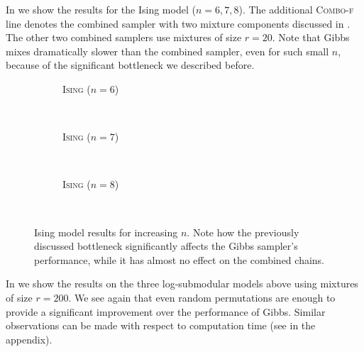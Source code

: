In  we show the results for the Ising model ($n = 6, 7, 8$).
The additional \textsc{Combo-f} line denotes the combined sampler with two mixture components discussed in .
The other two combined samplers use mixtures of size $r = 20$.
Note that Gibbs mixes dramatically slower than the combined sampler, even for such small $n$, because of the significant bottleneck we described before.

\setlength{}
\setlength{}
\renewcommand{\subflen}{1.0\textwidth}
\begin{figure}[htbp]
  \begin{subfigure}[b]{\subflen}
    \centering
    
    \vspace{-0.5em}
    \caption{\textsc{Ising} ($n = 6$)}
    \label{fig:ising6}
  \end{subfigure}\\[1em]
  \begin{subfigure}[b]{\subflen}
    \centering
    
    \vspace{-0.5em}
    \caption{\textsc{Ising} ($n = 7$)}
    \label{fig:ising7}
  \end{subfigure}\\[1em]
  \begin{subfigure}[b]{\subflen}
    \centering
    
    \vspace{-0.5em}
    \caption{\textsc{Ising} ($n = 8$)}
    \label{fig:ising8}
  \end{subfigure}\\[-0.5em]
  \caption{
    Ising model results for increasing $n$.
    Note how the previously discussed bottleneck significantly affects the Gibbs sampler's performance, while it has almost no effect on the combined chains.
    }
  \label{fig:expising}
\end{figure}

In  we show the results on the three log-submodular models above using mixtures of size $r = 200$.
We see again that even random permutations are enough to provide a significant improvement over the performance of Gibbs.
Similar observations can be made with respect to computation time (see  in the appendix).

